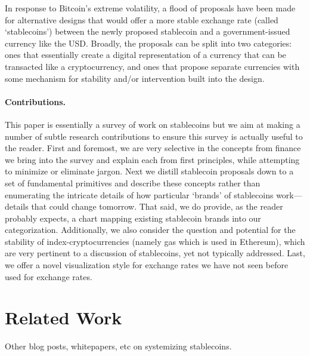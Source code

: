 In response to Bitcoin's extreme volatility, a flood of proposals have been made for alternative designs that would offer a more stable exchange rate (called `stablecoins') between the newly proposed stablecoin and a government-issued currency like the USD. Broadly, the proposals can be split into two categories: ones that essentially create a digital representation of a currency that can be transacted like a cryptocurrency, and ones that propose separate currencies with some mechanism for stability and/or intervention built into the design.

\paragraph{Contributions.} This paper is essentially a survey of work on stablecoins but we aim at making a number of subtle research contributions to ensure this survey is actually useful to the reader. First and foremost, we are very selective in the concepts from finance we bring into the survey and explain each from first principles, while attempting to minimize or eliminate jargon. Next we distill stablecoin proposals down to a set of fundamental primitives and describe these concepts rather than enumerating the intricate details of how particular `brands' of stablecoins work---details that could change tomorrow. That said, we do provide, as the reader probably expects, a chart mapping existing stablecoin brands into our categorization. Additionally, we also consider the question and potential for the stability of  index-cryptocurrencies (namely gas which is used in Ethereum), which are very pertinent to a discussion of stablecoins, yet not typically addressed. Last, we offer a novel visualization style for exchange rates we have not seen before used for exchange rates.




\section{Related Work}
\label{sec:lit}

Other blog posts, whitepapers, etc on systemizing stablecoins.



